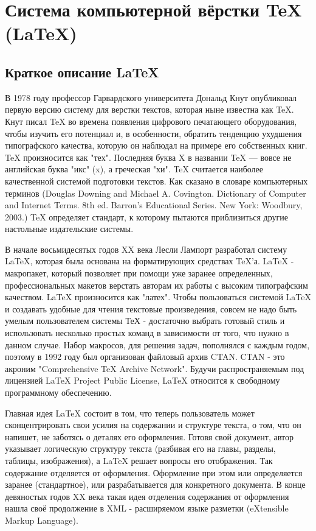 \documentclass[a4paper,14pt]{report} %
\begin{document}
\tableofcontents %
\chapter{Система компьютерной вёрстки TeX (LaTeX)}
\section{Краткое описание LaTeX}
В 1978 году профессор Гарвардского университета Дональд Кнут опубликовал первую версию систему для верстки текстов, которая ныне известна как TeX.  Кнут писал TeX во времена появления цифрового печатающего оборудования, чтобы изучить его потенциал и, в особенности, обратить тенденцию ухудшения типографского качества, которую он наблюдал на примере его собственных книг. TeX произносится как "тех". Последняя буква X в названии TeX — вовсе не английская буква "икс" (x), а греческая "хи". TeX считается наиболее качественной системой подготовки текстов. Как сказано в словаре компьютерных терминов (Douglas Downing and Michael A. Covington. Dictionary of Computer and Internet Terms. 8th ed. Barron's Educational Series. New York: Woodbury, 2003.) TeX определяет стандарт, к которому пытаются приблизиться другие настольные издательские системы.
\par
В начале восьмидесятых годов XX века Лесли Лампорт разработал систему LaTeX, которая была основана на форматирующих средствах TeX'а. LaTeX - макропакет, который позволяет при помощи уже заранее определенных, профессиональных макетов верстать авторам их работы с высоким типографским качеством. LaTeX произносится как "латех". Чтобы пользоваться системой LaTeX и создавать удобные для чтения текстовые произведения, совсем не надо быть умелым пользователем системы ТеХ - достаточно выбрать готовый стиль и использовать несколько простых команд в зависимости от того, что нужно в данном случае. Набор макросов, для решения задач, пополнялся с каждым годом, поэтому в 1992 году был организован файловый архив CTAN. CTAN - это акроним "Comprehensive TeX Archive Network". Будучи распространяемым под лицензией LaTeX Project Public License, LaTeX относится к свободному программному обеспечению.
\par
Главная идея LaTeX состоит в том, что теперь пользователь может сконцентрировать свои усилия на содержании и структуре текста, о том, что он напишет, не заботясь о деталях его оформления. Готовя свой документ, автор указывает логическую структуру текста (разбивая его на главы, разделы, таблицы, изображения), а LaTeX решает вопросы его отображения. Так содержание отделяется от оформления. Оформление при этом или определяется заранее (стандартное), или разрабатывается для конкретного документа. В конце девяностых годов XX века такая идея отделения содержания от оформления нашла своё продолжение в XML - расширяемом языке разметки (eXtensible Markup Language).
\end{document}
